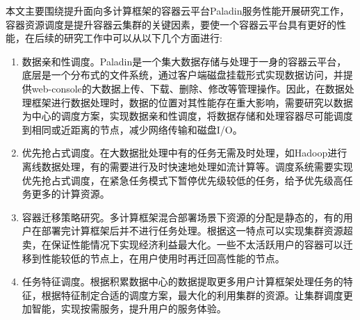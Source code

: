 本文主要围绕提升面向多计算框架的容器云平台Paladin服务性能开展研究工作，容器资源调度是提升容器云集群的关键因素，要使一个容器云平台具有更好的性能，在后续的研究工作中可以从以下几个方面进行:
\begin{enumerate}[1.]
	\item 数据亲和性调度。Paladin是一个集大数据存储与处理于一身的容器云平台，底层是一个分布式的文件系统，通过客户端磁盘挂载形式实现数据访问，并提供web-console的大数据上传、下载、删除、修改等管理操作。因此，在数据处理框架进行数据处理时，数据的位置对其性能存在重大影响，需要研究以数据为中心的调度方案，实现数据亲和性调度，将数据存储和处理容器尽可能调度到相同或近距离的节点，减少网络传输和磁盘I/O。
	\item 优先抢占式调度。在大数据批处理中有的任务无需及时处理，如Hadoop进行离线数据处理，有的需要进行及时快速地处理如流计算等。调度系统需要实现优先抢占式调度，在紧急任务模式下暂停优先级较低的任务，给予优先级高任务更多的计算资源。
	\item 容器迁移策略研究。多计算框架混合部署场景下资源的分配是静态的，有的用户在部署完计算框架后并不进行任务处理。根据这一特点可以实现集群资源超卖，在保证性能情况下实现经济利益最大化。一些不太活跃用户的容器可以迁移到性能较低的节点上，在用户使用时再迁回高性能的节点。
	\item 任务特征调度。根据积累数据中心的数据提取更多用户计算框架处理任务的特征，根据特征制定合适的调度方案，最大化的利用集群的资源。让集群调度更加智能，实现按需服务，提升用户的服务体验。
\end{enumerate}